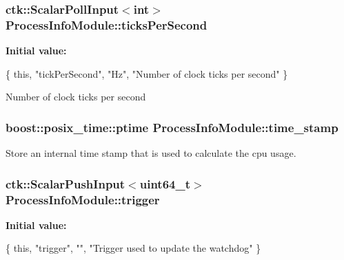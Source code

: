 \subsubsection[{\texorpdfstring{ticks\+Per\+Second}{ticksPerSecond}}]{\setlength{\rightskip}{0pt plus 5cm}ctk\+::\+Scalar\+Poll\+Input$<$int$>$ Process\+Info\+Module\+::ticks\+Per\+Second}\hypertarget{structProcessInfoModule_adf12150c732bc07aed50684eb8a90fd7}{}\label{structProcessInfoModule_adf12150c732bc07aed50684eb8a90fd7}
{\bfseries Initial value\+:}
\begin{DoxyCode}
\{ \textcolor{keyword}{this}, \textcolor{stringliteral}{"tickPerSecond"}, \textcolor{stringliteral}{"Hz"},
      \textcolor{stringliteral}{"Number of clock ticks per second"} \}
\end{DoxyCode}
Number of clock ticks per second 
\subsubsection[{\texorpdfstring{time\+\_\+stamp}{time_stamp}}]{\setlength{\rightskip}{0pt plus 5cm}boost\+::posix\+\_\+time\+::ptime Process\+Info\+Module\+::time\+\_\+stamp}\hypertarget{structProcessInfoModule_af863af6e454aa703037963ad401cae92}{}\label{structProcessInfoModule_af863af6e454aa703037963ad401cae92}
Store an internal time stamp that is used to calculate the cpu usage. 
\subsubsection[{\texorpdfstring{trigger}{trigger}}]{\setlength{\rightskip}{0pt plus 5cm}ctk\+::\+Scalar\+Push\+Input$<$uint64\+\_\+t$>$ Process\+Info\+Module\+::trigger}\hypertarget{structProcessInfoModule_a3f91718924955fc3bdbd2070c08eec2c}{}\label{structProcessInfoModule_a3f91718924955fc3bdbd2070c08eec2c}
{\bfseries Initial value\+:}
\begin{DoxyCode}
\{ \textcolor{keyword}{this}, \textcolor{stringliteral}{"trigger"}, \textcolor{stringliteral}{""},
      \textcolor{stringliteral}{"Trigger used to update the watchdog"} \}
\end{DoxyCode}
